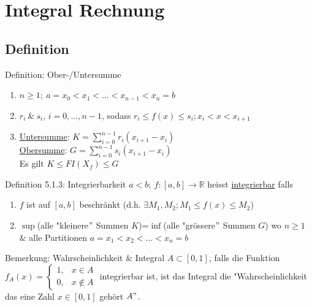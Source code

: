 \documentclass[a4paper,10pt]{article}
\begin{document}
\section{Integral Rechnung}
\subsection{Definition}
\begin{defbox}qlächeninhalt}
    \begin{itemize}
        \item $a<b;\ f:[a,b]\longrightarrow \mathbb R$
        \item  $\underline{X_f}=\bigg\{(x,y)\in \mathbb R^2\big|$
            \stackanchor{$a\le x\le b$}{$0 \le y\le f(x)$}
        $\bigg \} $
    \end{itemize}
\end{defbox}
\begin{defbox}
    {Definition: Ober-/Untersumme}
    \begin{enumerate}
        \item $n\ge 1; \ a=x_0<x_1<...<x_{n-1}<x_n=b$
        \item $r_i \ \& \ s_i$, $i=0,...,n-1$, sodass $r_i\le f(x)\le s_i; x_i<x<x_{i+1}$
        \item \underline{Untersumme}: $K=\sum_{i=0}^{n-1}r_i(x_{i+1}-x_i)$
        \\ \underline{Obersumme}: $G=\sum_{i=0}^{n-1}s_i(x_{i+1}-x_i)$
        \\ Es gilt $K\le FI(X_f)\le G$
    \end{enumerate}
\end{defbox}
\begin{defbox}
    {Definition 5.1.3: Integrierbarkeit}
    $a<b;\ f:[a,b]\longrightarrow \mathbb R$ heisst \underline{integrierbar} falls
    \begin{enumerate}
        \item $f$ ist auf $[a,b]$ beschränkt (d.h. $\exists M_1, M_2; M_1\le f(x)\le M_2$)
        \item  $\sup$(alle "kleinere$"$ Summen $K$)=$\inf$(alle "grössere$"$ Summen $G$) wo $n\ge 1$ \& alle Partitionen $a=x_1<x_2<...<x_n=b$
    \end{enumerate}
\end{defbox}
\begin{bembox}
    {Bemerkung: Wahrscheinlichkeit \& Integral}
    $A\subset [0,1]$, falls die Funktion $f_A(x)=
    \begin{cases}
        1, & x\in A
        \\ 0, & x\notin A
    \end{cases}$
    integrierbar ist, ist das Integral die "Wahrscheinlichkeit das eine Zahl $x\in[0,1]$ gehört $A"$.
\end{bembox}
\end{document}
